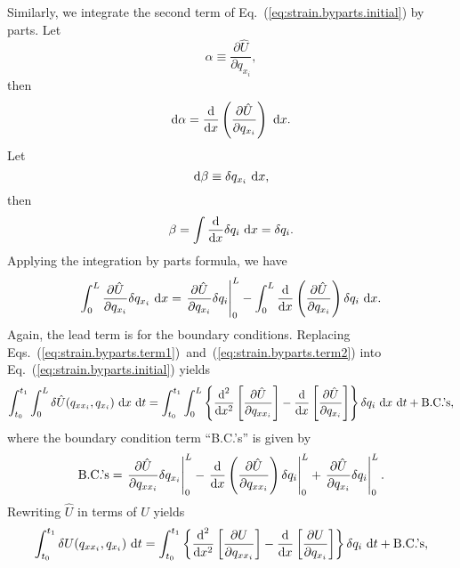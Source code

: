 Similarly, we integrate the second term of Eq.~(\ref{eq:strain.byparts.initial}) by parts. Let
\begin{equation}
\alpha \equiv \frac{\partial \hat U}{\partial q_{x_i}},
\end{equation}
then 
\begin{equation}
\text d\alpha = \frac{\text d}{\text dx}\left(\frac{\partial \hat U}{\partial q_{x_i}}\right)\text{ d}x.
\end{equation}
Let
\begin{equation}
\text d\beta \equiv \delta q_{x_i}\text{ d}x,
\end{equation}
then
\begin{equation}
\beta = \int \frac{\text d}{\text dx}\delta q_i\text{ d}x = \delta q_i.
\end{equation}
Applying the integration by parts formula, we have
\begin{equation}
\int_0^L\frac{\partial \hat U}{\partial q_{x_i}}\delta q_{x_i}\text{ d}x = \left.\frac{\partial \hat U}{\partial q_{x_i}}\delta q_i\right|_0^L - \int_0^L \frac{\text d}{\text dx}\left(\frac{\partial \hat U}{\partial q_{x_i}}\right)\delta q_i\text{ d}x.
\label{eq:strain.byparts.term2}
\end{equation}
Again, the lead term is for the boundary conditions. Replacing Eqs.~(\ref{eq:strain.byparts.term1})~and~(\ref{eq:strain.byparts.term2}) into Eq.~(\ref{eq:strain.byparts.initial}) yields
\begin{equation}
\int_{t_0}^{t_1}\int_0^L\delta \hat U(q_{xx_i},q_{x_i})\text{ d}x\text{ d}t = \int_{t_0}^{t_1} \int_0^L \left\lbrace\frac{\text d^2}{\text dx^2}\left[\frac{\partial \hat{U}}{\partial q_{xx_i}}\right]-\frac{\text d}{\text dx}\left[\frac{\partial \hat U}{\partial q_{x_i}}\right]\right\rbrace\delta q_i\text{ d}x\text{ d}t + \text{B.C.'s},
\end{equation}
where the boundary condition term ``B.C.'s'' is given by
\begin{equation}
\text{B.C.'s} = \left.\frac{\partial \hat U}{\partial q_{xx_i}}\delta q_{x_i}\right|_0^L-\left.\frac{\text d}{\text dx}\left(\frac{\partial \hat{U}}{\partial q_{xx_i}}\right)\delta q_i\right|_0^L + \left.\frac{\partial \hat U}{\partial q_{x_i}}\delta q_i\right|_0^L.
\end{equation}
Rewriting $\hat U$ in terms of $U$ yields
\begin{equation}
\int_{t_0}^{t_1}\delta U(q_{xx_i},q_{x_i})\text{ d}t = \int_{t_0}^{t_1} \left\lbrace\frac{\text d^2}{\text dx^2}\left[\frac{\partial U}{\partial q_{xx_i}}\right]-\frac{\text d}{\text dx}\left[\frac{\partial  U}{\partial q_{x_i}}\right]\right\rbrace\delta q_i\text{ d}t + \text{B.C.'s},
\end{equation}
